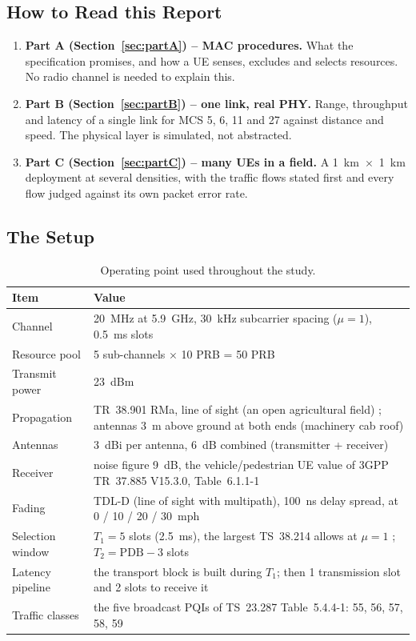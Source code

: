 \documentclass{article}
\newcommand{\Tone}{T_1}
\newcommand{\Ttwo}{T_2}
\begin{document}
\subsection{How to Read this Report}

\begin{enumerate}[nosep]
  \item \textbf{Part A (Section~\ref{sec:partA}) -- MAC procedures.}
  What the specification promises, and how a UE senses, excludes and
  selects resources. No radio channel is needed to explain this.
  \item \textbf{Part B (Section~\ref{sec:partB}) -- one link, real PHY.}
  Range, throughput and latency of a single link for MCS 5, 6, 11 and 27
  against distance and speed. The physical layer is simulated, not
  abstracted.
  \item \textbf{Part C (Section~\ref{sec:partC}) -- many UEs in a field.}
  A 1~km~$\times$~1~km deployment at several densities, with the traffic
  flows stated first and every flow judged against its own packet error
  rate.
\end{enumerate}

\subsection{The Setup}
\label{sec:setup}

\begin{table}[H]
\centering
\caption{Operating point used throughout the study.}
\label{tab:setup}
\small
\begin{tabularx}{\textwidth}{l X}
\toprule
\textbf{Item} & \textbf{Value} \\
\midrule
Channel & 20~MHz at 5.9~GHz, 30~kHz subcarrier spacing ($\mu = 1$), 0.5~ms slots \\
Resource pool & 5 sub-channels $\times$ 10 PRB = 50 PRB \\
Transmit power & 23~dBm \\
Propagation & TR~38.901 RMa, line of sight (an open agricultural field) \cite{ref:38901}; antennas 3~m above ground at both ends (machinery cab roof) \\
Antennas & 3~dBi per antenna, 6~dB combined (transmitter + receiver) \\
Receiver & noise figure 9~dB, the vehicle/pedestrian UE value of 3GPP TR~37.885 V15.3.0, Table~6.1.1-1 \cite{ref:37885} \\
Fading & TDL-D (line of sight with multipath), 100~ns delay spread, at 0 / 10 / 20 / 30~mph \\
Selection window & $\Tone = 5$ slots (2.5~ms), the largest TS~38.214 allows at $\mu = 1$ \cite{ref:38214}; $\Ttwo = \mathrm{PDB} - 3$ slots \\
Latency pipeline & the transport block is built during $\Tone$; then 1 transmission slot and 2 slots to receive it \\
Traffic classes & the five broadcast PQIs of TS~23.287 Table~5.4.4-1: 55, 56, 57, 58, 59 \cite{ref:23287} \\
\bottomrule
\end{tabularx}
\end{table}
\end{document}
